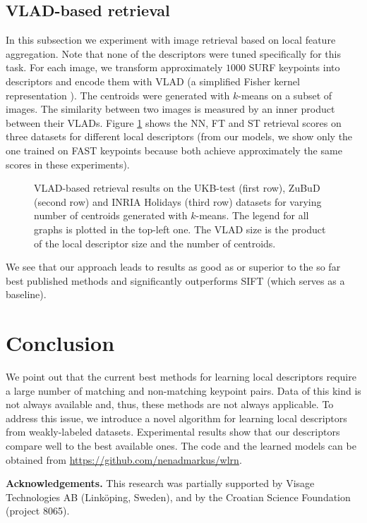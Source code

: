 \documentclass[twocolumn]{article}
\begin{document}
		\subsection{VLAD-based retrieval}
			In this subsection we experiment with image retrieval based on local feature aggregation.
			Note that none of the descriptors were tuned specifically for this task.
			For each image, we transform approximately $1000$ SURF \cite{surf} keypoints into descriptors and encode them with VLAD \cite{vlad} (a simplified Fisher kernel representation \cite{fisherkernel}).
			The centroids were generated with $k$-means on a subset of images.
			The similarity between two images is measured by an inner product between their VLADs.
			Figure \ref{fig:vlad} shows the NN, FT and ST retrieval scores on three datasets for different local descriptors
			(from our models, we show only the one trained on FAST keypoints because both achieve approximately the same scores in these experiments).
			\begin{figure}[ht]
				\centering
				\resizebox{1.7\columnwidth}{!}
				{
					
				}
				\resizebox{1.7\columnwidth}{!}
				{
					
				}
				\resizebox{1.7\columnwidth}{!}
				{
					
				}
				\caption
				{
					VLAD-based retrieval results on the UKB-test (first row), ZuBuD (second row) and INRIA Holidays (third row) datasets for varying number of centroids generated with $k$-means.
					The legend for all graphs is plotted in the top-left one.
					The VLAD size is the product of the local descriptor size and the number of centroids.
				}
				\label{fig:vlad}
			\end{figure}
			We see that our approach leads to results as good as or superior to the so far best published methods and significantly outperforms SIFT (which serves as a baseline).

	\section{Conclusion}
		We point out that the current best methods for learning local descriptors require a large number of matching and non-matching keypoint pairs.
		Data of this kind is not always available and, thus, these methods are not always applicable.
		To address this issue, we introduce a novel algorithm for learning local descriptors from weakly-labeled datasets.
		Experimental results show that our descriptors compare well to the best available ones.
		The code and the learned models can be obtained from \url{https://github.com/nenadmarkus/wlrn}. %

	\textbf{Acknowledgements.}
	This research was partially supported by Visage Technologies AB (Link\"oping, Sweden), and by the Croatian Science Foundation (project 8065).

	\small
	
	
\end{document}
